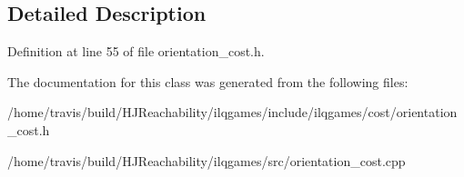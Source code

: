 \subsection{Detailed Description}


Definition at line 55 of file orientation\+\_\+cost.\+h.



The documentation for this class was generated from the following files\+:\begin{DoxyCompactItemize}
\item 
/home/travis/build/\+H\+J\+Reachability/ilqgames/include/ilqgames/cost/orientation\+\_\+cost.\+h\item 
/home/travis/build/\+H\+J\+Reachability/ilqgames/src/orientation\+\_\+cost.\+cpp\end{DoxyCompactItemize}
